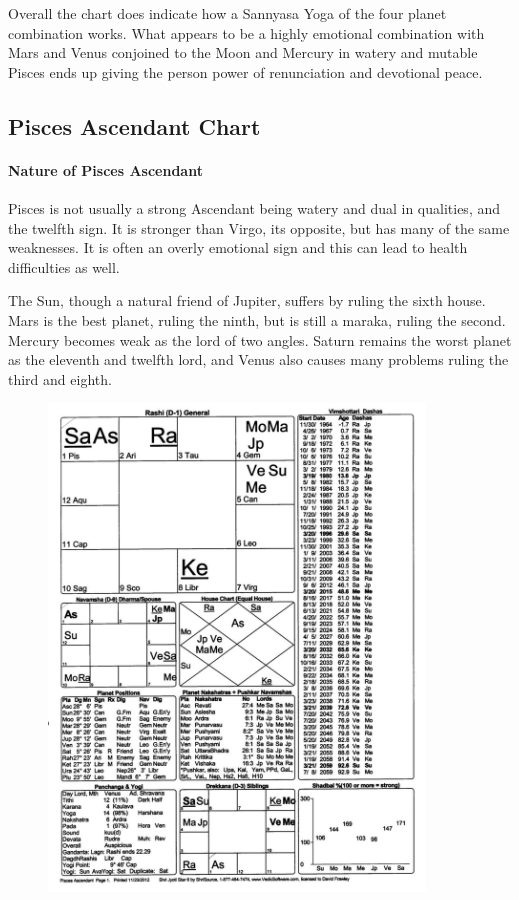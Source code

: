  

Overall the chart does indicate how a Sannyasa Yoga of the four planet combination works. What appears to be a highly emotional combination with Mars and Venus conjoined to the Moon and Mercury in watery and mutable Pisces ends up giving the person power of renunciation and devotional peace.

 

\subsection{Pisces Ascendant Chart}
 

\paragraph{Nature of Pisces Ascendant}

 

Pisces is not usually a strong Ascendant being watery and dual in qualities, and the twelfth sign. It is stronger than Virgo, its opposite, but has many of the same weaknesses. It is often an overly emotional sign and this can lead to health difficulties as well.

 

The Sun, though a natural friend of Jupiter, suffers by ruling the sixth house. Mars is the best planet, ruling the ninth, but is still a maraka, ruling the second. Mercury becomes weak as the lord of two angles. Saturn remains the worst planet as the eleventh and twelfth lord, and Venus also causes many problems ruling the third and eighth.

 

\begin{figure}[h]
\centering
\includegraphics[width=10cm]{pics/Pisces-Ascendant.jpg}
\caption{}
\end{figure}
 

